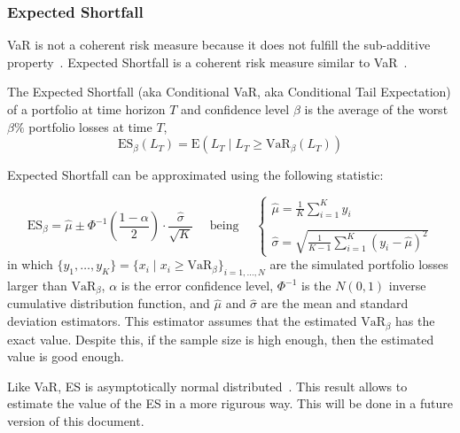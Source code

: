 \documentclass[11pt,fleqn]{book} %
\begin{document}
\subsubsection{Expected Shortfall}

VaR is not a coherent risk measure because it does not fulfill the 
sub-additive property~\cite{var:varbad}. Expected Shortfall is a coherent 
risk measure similar to VaR~\cite{var:eshortfall}.

\begin{definition}
	The Expected Shortfall (aka Conditional VaR, aka Conditional Tail 
	Expectation) of a portfolio at time horizon $T$ and 
	confidence level $\beta$ is the average of the worst $\beta\%$ portfolio 
	losses at time $T$,
	\begin{displaymath}
		\text{ES}_\beta(L_T) = \text{E}(L_T \mid L_T \ge \text{VaR}_\beta(L_T))
	\end{displaymath}
\end{definition}

Expected Shortfall can be approximated using the following statistic:

\begin{displaymath}
	\text{ES}_{\beta} = \widehat{\mu} \pm \Phi^{-1}\left(\frac{1-\alpha}{2}\right) \cdot \frac{\widehat{\sigma}}{\sqrt{K}}
	\quad \text{ being } \quad
	\left\{
	\begin{array}{l}
		\displaystyle
		\widehat{\mu} = \frac{1}{K} \sum_{i=1}^{K} y_i \\
		\\
		\displaystyle
		\widehat{\sigma} =
		\sqrt{\frac{1}{K-1} \sum_{i=1}^{K} \left( y_i - \widehat{\mu} \right)^2}
	\end{array}
	\right.
\end{displaymath}
in which 
$\{y_1, \ldots, y_K\} = \{x_i \mid x_i \ge \text{VaR}_{\beta} \}_{i=1,\dots,N}$ 
are the simulated portfolio losses larger than $\text{VaR}_{\beta}$, 
$\alpha$ is the error confidence level, $\Phi^{-1}$ is the $N(0,1)$ 
inverse cumulative distribution function, and $\widehat{\mu}$ and 
$\widehat{\sigma}$ are the mean and standard deviation estimators.
This estimator assumes that the estimated $\text{VaR}_{\beta}$ has the 
exact value. Despite this, if the sample size is high enough, then the 
estimated value is good enough. 

Like VaR, ES is asymptotically normal distributed~\cite{brereton:2012}.
This result allows to estimate the value of the ES in a more rigurous way.
This will be done in a future version of this document.
\end{document}

